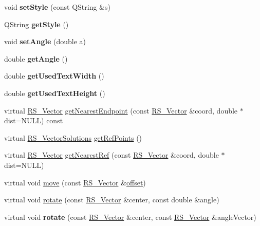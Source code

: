 \begin{DoxyCompactItemize}
\item 
\hypertarget{classRS__Text_aa54283ed6fa7d703a0559cd41f459171}{void {\bfseries set\-Style} (const Q\-String \&s)}\label{classRS__Text_aa54283ed6fa7d703a0559cd41f459171}

\item 
\hypertarget{classRS__Text_a389b380cb3b4d1921549fa5af20360da}{Q\-String {\bfseries get\-Style} ()}\label{classRS__Text_a389b380cb3b4d1921549fa5af20360da}

\item 
\hypertarget{classRS__Text_a76449b540837eed7f677e7113a20f01e}{void {\bfseries set\-Angle} (double a)}\label{classRS__Text_a76449b540837eed7f677e7113a20f01e}

\item 
\hypertarget{classRS__Text_adee41b2c943607dceae322ba092dd989}{double {\bfseries get\-Angle} ()}\label{classRS__Text_adee41b2c943607dceae322ba092dd989}

\item 
\hypertarget{classRS__Text_aac3f00e2a06e34fd414ab6af1027eda9}{double {\bfseries get\-Used\-Text\-Width} ()}\label{classRS__Text_aac3f00e2a06e34fd414ab6af1027eda9}

\item 
\hypertarget{classRS__Text_aec12863c3e9f0b2dd8b68e68c10a909e}{double {\bfseries get\-Used\-Text\-Height} ()}\label{classRS__Text_aec12863c3e9f0b2dd8b68e68c10a909e}

\item 
virtual \hyperlink{classRS__Vector}{R\-S\-\_\-\-Vector} \hyperlink{classRS__Text_a2b6987248a14431b9861756979408a33}{get\-Nearest\-Endpoint} (const \hyperlink{classRS__Vector}{R\-S\-\_\-\-Vector} \&coord, double $\ast$dist=N\-U\-L\-L) const 
\item 
virtual \hyperlink{classRS__VectorSolutions}{R\-S\-\_\-\-Vector\-Solutions} \hyperlink{classRS__Text_a8203ca5838bc56f60b7c2fd4f5f838bb}{get\-Ref\-Points} ()
\item 
virtual \hyperlink{classRS__Vector}{R\-S\-\_\-\-Vector} \hyperlink{classRS__Text_a65a5b47ba81df5a41806a2cc4bf71e7e}{get\-Nearest\-Ref} (const \hyperlink{classRS__Vector}{R\-S\-\_\-\-Vector} \&coord, double $\ast$dist=N\-U\-L\-L)
\item 
virtual void \hyperlink{classRS__Text_a904508a575b7fcd8196fda5def540b12}{move} (const \hyperlink{classRS__Vector}{R\-S\-\_\-\-Vector} \&\hyperlink{classRS__Entity_aa296d21b9aac99161d386ce2f60f0fea}{offset})
\item 
virtual void \hyperlink{classRS__Text_aa449ca432cd3e991a2152ee0e7da6a70}{rotate} (const \hyperlink{classRS__Vector}{R\-S\-\_\-\-Vector} \&center, const double \&angle)
\item 
\hypertarget{classRS__Text_a99e4a9ef7bb96e7a8d37ffcd54bb3534}{virtual void {\bfseries rotate} (const \hyperlink{classRS__Vector}{R\-S\-\_\-\-Vector} \&center, const \hyperlink{classRS__Vector}{R\-S\-\_\-\-Vector} \&angle\-Vector)}\label{classRS__Text_a99e4a9ef7bb96e7a8d37ffcd54bb3534}


\end{DoxyCompactItemize}
